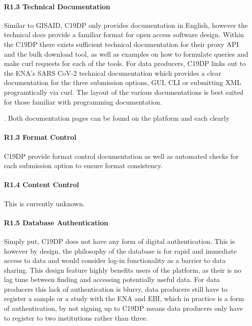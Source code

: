 \documentclass{article}
\begin{document}
\hypertarget{r1.3-technical-documentation}{%
\paragraph{R1.3 Technical
Documentation}\label{r1.3-technical-documentation}}

Similar to GISAID, C19DP only provides documentation in English, however
the technical docs provide a familiar format for open access software
design. Within the C19DP there exists sufficient technical documentation
for their proxy API and the bulk download tool, as well as examples on
how to formulate queries and make curl requests for each of the tools.
For data producers, C19DP links out to the ENA's SARS CoV-2 technical
documentation which provides a clear documentation for the three
submission options, GUI, CLI or submitting XML programtically via curl.
The layout of the various documentations is best suited for those
familiar with programming documentation.

. Both documentation pages can be found on the platform and each clearly

\hypertarget{r1.3-format-control-1}{%
\paragraph{R1.3 Format Control}\label{r1.3-format-control-1}}

C19DP provide format control documentation as well as automated checks
for each submission option to ensure format consistency.

\hypertarget{r1.4-content-control-1}{%
\paragraph{R1.4 Content Control}\label{r1.4-content-control-1}}

This is currently unknown.

\hypertarget{r1.5-database-authentication-1}{%
\paragraph{R1.5 Database
Authentication}\label{r1.5-database-authentication-1}}

Simply put, C19DP does not have any form of digital authentication. This
is however by design, the philosophy of the database is for rapid and
immediate access to data and would consider log-in functionality as a
barrier to data sharing. This design feature highly benefits users of
the platform, as their is no lag time between finding and accessing
potentially useful data. For data producers this lack of authentication
is blurry, data producers still have to register a sample or a study
with the ENA and EBI, which in practice is a form of authentication, by
not signing up to C19DP means data producers only have to register to
two institutions rather than three.
\end{document}
